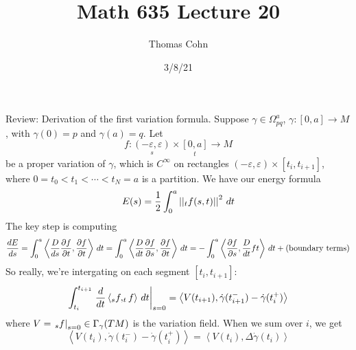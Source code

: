 \documentclass[10pt,letterpaper]{article}
\author{Thomas Cohn}
\title{Math 635 Lecture 20}
\date{3/8/21} %
\newcommand{\n}{\hfill\break}
\newcommand{\ptxt}[1]{\textrm{\textnormal{#1}}}
\let\d\relax
\newcommand{\d}{\partial}
\newcommand{\abs}[1]{\left|#1\right|}
\newcommand{\restr}[1]{\left.#1\right|}
\newcommand{\norm}[1]{\abs{\abs{#1}}}
\newcommand{\iprod}[1]{\left<#1\right>}
\newcommand{\pd}[2]{\frac{\partial{}#1}{\partial{}#2}}
\begin{document}
\maketitle
\setlength\RaggedRightParindent{\parindent}
\RaggedRight


\par\noindent
Review: Derivation of the first variation formula. Suppose $\gamma\in\Omega_{pq}^{a}$, $\gamma:[0,a]\to{}M$, with $\gamma(0)=p$ and $\gamma(a)=q$. Let
\[
	f:\underset{s}{(-\varepsilon,\varepsilon)}\times\underset{t}{[0,a]}\to{}M
\]
be a proper variation of $\gamma$, which is $C^{\infty}$ on rectangles $(-\varepsilon,\varepsilon)\times[t_{i},t_{i+1}]$, where $0=t_{0}<t_{1}<\cdots<t_{N}=a$ is a partition. We have our energy formula
\[
	E(s)=\frac{1}{2}\int_{0}^{a}\norm{\d_{t}f(s,t)}^{2}\,dt
\]
The key step is computing
\[
	\frac{dE}{ds}=\int_{0}^{a}\iprod{\frac{D}{ds}\pd{f}{t},\pd{f}{t}}\,dt=\int_{0}^{a}\iprod{\frac{D}{dt}\pd{f}{s},\pd{f}{t}}\,dt=-\int_{0}^{a}\iprod{\pd{f}{s},\frac{D}{dt}\d{f}{t}}\,dt+\ptxt{(boundary terms)}
\]
So really, we're intergating on each segment $[t_{i},t_{i+1}]$:
\[
	\int_{t_{i}}^{t_{i+1}}\restr{\frac{d}{dt}\iprod{\d_{s}f,\d_{t}f}\,dt}_{s=0}=\iprod{V(t_{i+1}),\dot\gamma(t_{i+1}^{-})-\dot\gamma(t_{i}^{+})}
\]
where $V=\restr{\d_{s}f}_{s=0}\in\Gamma_{\gamma}(TM)$ is the variation field. When we sum over $i$, we get
\[
	\iprod{V(t_{i}),\dot\gamma(t_{i}^{-})-\dot\gamma(t_{i}^{+})}=\iprod{V(t_{i}),\Delta\dot\gamma(t_{i})}
\]
\end{document}
